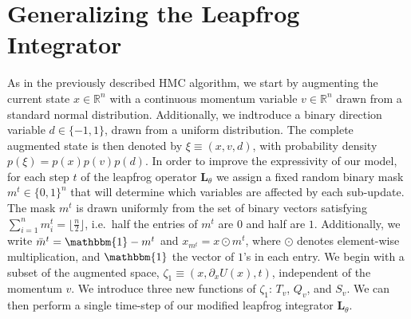 \documentclass[main.tex]{subfiles}
\begin{document}
\section{Generalizing the Leapfrog Integrator}
As in the previously described HMC algorithm, we start by augmenting the current state $x \in \mathbb{R}^n$ with a
continuous momentum variable $v \in \mathbb{R}^{n}$ drawn from a standard normal distribution.
%
Additionally, we indtroduce a binary direction variable $d \in \{ -1, 1\}$, drawn from a uniform distribution. 
%
The complete augmented state is then denoted by $\xi \equiv (x, v, d)$, with probability density $p(\xi) = p(x) p(v)
p(d)$.
%
In order to improve the expressivity of our model, for each step $t$ of the leapfrog operator $\mathbf{L}_{\theta}$ we
assign a fixed random binary mask $m^{t} \in{\{0, 1\}}^n$ that will determine which variables are affected by each
sub-update.
%
The mask $m^t$ is drawn uniformly from the set of binary vectors satisfying $\sum_{i=1}^{n} m_{i}^{t} = \lfloor
\frac{n}{2}\rfloor$, i.e.\ half the entries of $m^t$ are $0$ and half are $1$.
%
Additionally, we write $\bar m^{t} = \mathbbm{1} - m^{t}$ and $x_{m^t} = x \odot m^{t}$, where $\odot$ denotes
element-wise multiplication, and $\mathbbm{1}$ the vector of $1$'s in each entry.
%
%
We begin with a subset of the augmented space, $\zeta_1 \equiv (x, \partial_{x} U(x), t)$, independent of the momentum
$v$.
%
We introduce three new functions of $\zeta_1$: $T_v$, $Q_v$, and $S_v$.
%
We can then perform a single time-step of our modified leapfrog integrator $\mathbf{L}_{\theta}$.
%
\end{document}
